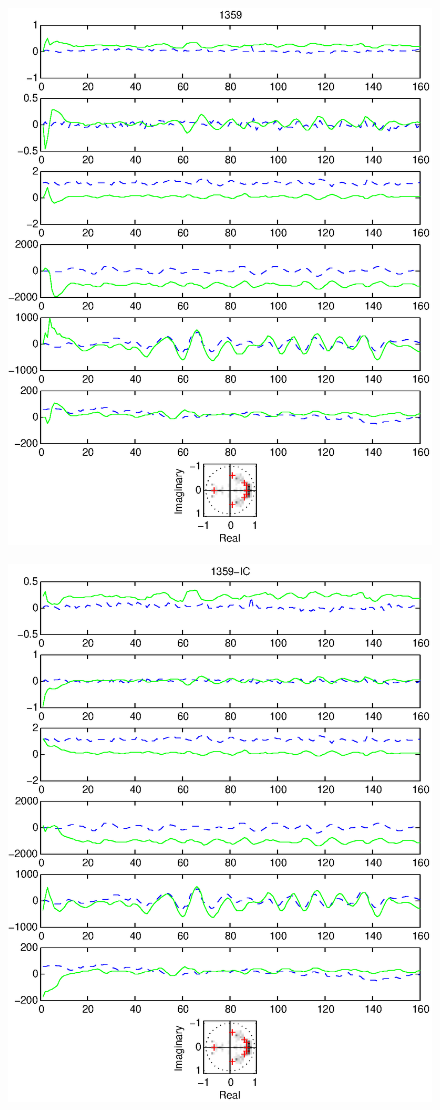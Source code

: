 \documentclass{article}
\begin{document}
\begin{figure}[htb!]
\centering
\includegraphics{1359.eps}
\end{figure}\clearpage
\begin{figure}[htb!]
\centering
\includegraphics{1359_ic.eps}
\end{figure}\clearpage
\end{document}
